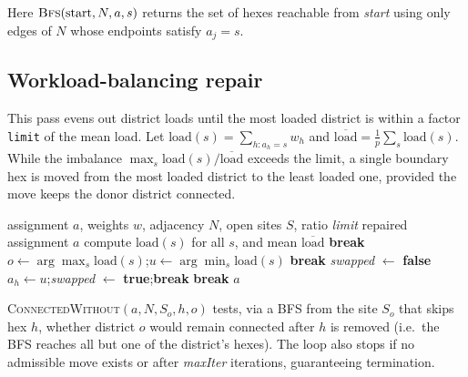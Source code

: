 \documentclass[11pt]{article}
\begin{document}
Here $\textsc{Bfs}(\text{start}, N, a, s)$ returns the set of hexes reachable
from \emph{start} using only edges of $N$ whose endpoints satisfy $a_j = s$.

\subsection*{Workload-balancing repair}

This pass evens out district loads until the most loaded district is within a
factor \texttt{limit} of the mean load. Let
$\mathrm{load}(s) = \sum_{h : a_h = s} w_h$ and
$\overline{\mathrm{load}} = \frac{1}{p}\sum_s \mathrm{load}(s)$. While the
imbalance $\max_s \mathrm{load}(s) / \overline{\mathrm{load}}$ exceeds the limit,
a single boundary hex is moved from the most loaded district to the least loaded
one, provided the move keeps the donor district connected.

\begin{algorithm}[h]
\caption{Workload-balancing repair}
\label{alg:workload}
\begin{algorithmic}[1]
  \Require assignment $a$, weights $w$, adjacency $N$, open sites $S$, ratio \textit{limit}
  \Ensure repaired assignment $a$
    \State compute $\mathrm{load}(s)$ for all $s$, and mean $\overline{\mathrm{load}}$
      \State \textbf{break}
    \EndIf
    \State $o \gets \arg\max_s \mathrm{load}(s)$;\quad $u \gets \arg\min_s \mathrm{load}(s)$
     \State \textbf{break} \EndIf
    \State \textit{swapped} $\gets$ \textbf{false}
        \State $a_h \gets u$;\quad \textit{swapped} $\gets$ \textbf{true};\quad \textbf{break}
      \EndIf
    \EndFor
     \State \textbf{break} \EndIf
  \EndFor
  \State \Return $a$
\end{algorithmic}
\end{algorithm}

\textsc{ConnectedWithout}$(a, N, S_o, h, o)$ tests, via a BFS from the site
$S_o$ that skips hex $h$, whether district $o$ would remain connected after $h$
is removed (i.e.\ the BFS reaches all but one of the district's hexes). The loop
also stops if no admissible move exists or after \textit{maxIter} iterations,
guaranteeing termination.
\end{document}
